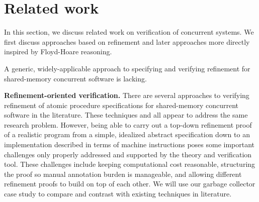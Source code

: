 
\section{Related work}
\label{sec:related}

In this section, we discuss related work on verification of concurrent systems.
We first discuss approaches based on refinement and later approaches more directly inspired 
by Floyd-Hoare reasoning.

A generic, widely-applicable approach to specifying and verifying refinement for shared-memory concurrent software is lacking. 

{\bf Refinement-oriented verification.}  
There are several approaches
to verifying refinement of atomic procedure specifications for
shared-memory concurrent software in the literature.  
These techniques
and \civl all appear to address the same research problem.  
However, being able to carry out a top-down refinement proof of a realistic
program from a simple, idealized abstract specification down to an
implementation described in terms of machine instructions poses some
important challenges 
only properly addressed and supported by the
\civl theory and verification tool. 
These challenges include keeping computational cost reasonable,
structuring the proof so manual annotation burden is manageable, 
and allowing different refinement proofs to build on top of each
other. 
We will use our garbage collector case study to compare and contrast
\civl with existing techniques in literature. 

